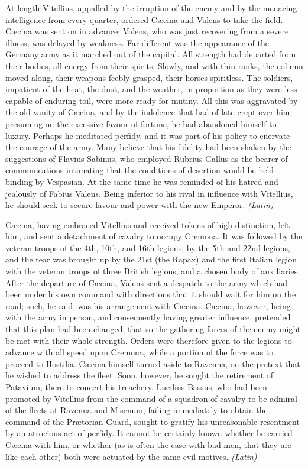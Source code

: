 
At length Vitellius, appalled by the irruption of the enemy and by the menacing intelligence from every quarter, ordered Cæcina and Valens to take the field. Cæcina was sent on in advance; Valens, who was just recovering from a severe illness, was delayed by weakness. Far different was the appearance of the Germany army as it marched out of the capital. All strength had departed from their bodies, all energy from their spirits. Slowly, and with thin ranks, the column moved along, their weapons feebly grasped, their horses spiritless. The soldiers, impatient of the heat, the dust, and the weather, in proportion as they were less capable of enduring toil, were more ready for mutiny. All this was aggravated by the old vanity of Cæcina, and by the indolence that had of late crept over him; presuming on the excessive favour of fortune, he had abandoned himself to luxury. Perhaps he meditated perfidy, and it was part of his policy to enervate the courage of the army. Many believe that his fidelity had been shaken by the suggestions of Flavius Sabinus, who employed Rubrius Gallus as the bearer of communications intimating that the conditions of desertion would be held binding by Vespasian. At the same time he was reminded of his hatred and jealously of Fabius Valens. Being inferior to his rival in influence with Vitellius, he should seek to secure favour and power with the new Emperor. \emph{(Latin)}


Cæcina, having embraced Vitellius and received tokens of high distinction, left him, and sent a detachment of cavalry to occupy Cremona. It was followed by the veteran troops of the 4th, 10th, and 16th legions, by the 5th and 22nd legions, and the rear was brought up by the 21st (the Rapax) and the first Italian legion with the veteran troops of three British legions, and a chosen body of auxiliaries. After the departure of Cæcina, Valens sent a despatch to the army which had been under his own command with directions that it should wait for him on the road; such, he said, was his arrangement with Cæcina. Cæcina, however, being with the army in person, and consequently having greater influence, pretended that this plan had been changed, that so the gathering forces of the enemy might be met with their whole strength. Orders were therefore given to the legions to advance with all speed upon Cremona, while a portion of the force was to proceed to Hostilia. Cæcina himself turned aside to Ravenna, on the pretext that he wished to address the fleet. Soon, however, he sought the retirement of Patavium, there to concert his treachery. Lucilius Bassus, who had been promoted by Vitellius from the command of a squadron of cavalry to be admiral of the fleets at Ravenna and Misenum, failing immediately to obtain the command of the Prætorian Guard, sought to gratify his unreasonable resentment by an atrocious act of perfidy. It cannot be certainly known whether he carried Cæcina with him, or whether (as is often the case with bad men, that they are like each other) both were actuated by the same evil motives. \emph{(Latin)}

